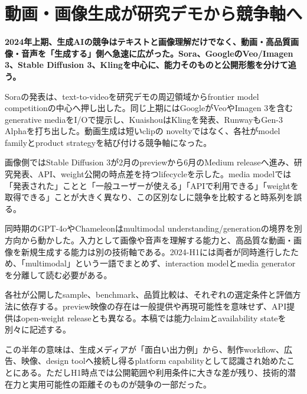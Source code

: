 \section{動画・画像生成が研究デモから競争軸へ}
\noindent\textbf{2024年上期、生成AIの競争はテキストと画像理解だけでなく、動画・高品質画像・音声を「生成する」側へ急速に広がった。Sora、GoogleのVeo/Imagen 3、Stable Diffusion 3、Klingを中心に、能力そのものと公開形態を分けて追う。}\autocite{src-0f33134a9129,src-0fe343211040,src-7b3484ead314,src-9c32b95d27a7}

Soraの発表は、text-to-videoを研究デモの周辺領域からfrontier model competitionの中心へ押し出した。同じ上期にはGoogleがVeoやImagen 3を含むgenerative mediaをI/Oで提示し、KuaishouはKlingを発表、RunwayもGen-3 Alphaを打ち出した。動画生成は短いclipの noveltyではなく、各社がmodel familyとproduct strategyを結び付ける競争軸になった。\autocite{src-0f33134a9129,src-0fe343211040,src-9c32b95d27a7,src-b881d1321d94}


画像側ではStable Diffusion 3が2月のpreviewから6月のMedium releaseへ進み、研究発表、API、weight公開の時点差を持つlifecycleを示した。media modelでは「発表された」ことと「一般ユーザーが使える」「APIで利用できる」「weightを取得できる」ことが大きく異なり、この区別なしに競争を比較すると時系列を誤る。\autocite{src-7b3484ead314}


同時期のGPT-4oやChameleonはmultimodal understanding/generationの境界を別方向から動かした。入力として画像や音声を理解する能力と、高品質な動画・画像を新規生成する能力は別の技術軸である。2024-H1には両者が同時進行したため、「multimodal」という一語でまとめず、interaction modelとmedia generatorを分離して読む必要がある。\autocite{src-0f33134a9129,src-0fe343211040,src-2d3a533e91db,src-e1259b3c0804}


\begin{claimboundary}
各社が公開したsample、benchmark、品質比較は、それぞれの選定条件と評価方法に依存する。preview映像の存在は一般提供や再現可能性を意味せず、API提供はopen-weight releaseとも異なる。本稿では能力claimとavailability stateを別々に記述する。\autocite{src-0f33134a9129,src-0fe343211040,src-36cdd427b766,src-7b3484ead314,src-9c32b95d27a7}
\end{claimboundary}

この半年の意味は、生成メディアが「面白い出力例」から、制作workflow、広告、映像、design toolへ接続し得るplatform capabilityとして認識され始めたことにある。ただしH1時点では公開範囲や利用条件に大きな差が残り、技術的潜在力と実用可能性の距離そのものが競争の一部だった。\autocite{src-0f33134a9129,src-0fe343211040,src-7b3484ead314,src-9c32b95d27a7,src-b881d1321d94}
